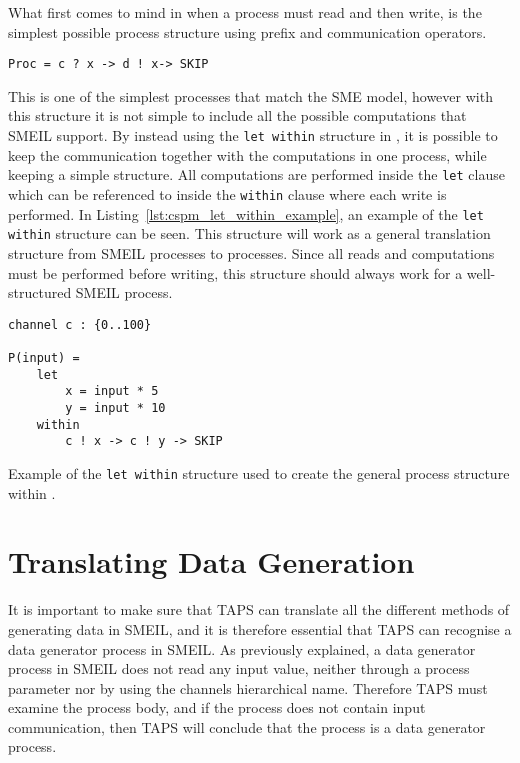 What first comes to mind in \cspm{} when a process must read and then write, is the simplest possible process structure using prefix and communication operators.
\begin{verbatim}
Proc = c ? x -> d ! x-> SKIP
\end{verbatim}
This is one of the simplest \cspm{} processes that match the SME model, however with this structure it is not simple to include all the possible computations that SMEIL support. By instead using the \texttt{let within} structure in \cspm{}, it is possible to keep the communication together with the computations in one \cspm{} process, while keeping a simple structure. All computations are performed inside the \texttt{let} clause which can be referenced to inside the \texttt{within} clause where each write is performed.
In Listing~\ref{lst:cspm_let_within_example}, an example of the \texttt{let within} structure can be seen. This structure will work as a general translation structure from SMEIL processes to \cspm{} processes. Since all reads and computations must be performed before writing, this structure should always work for a well-structured SMEIL process.
\begin{listing}
\begin{verbatim}
channel c : {0..100}

P(input) =
    let
        x = input * 5
        y = input * 10
    within
        c ! x -> c ! y -> SKIP
\end{verbatim}
\caption{Example of the \texttt{let within} structure used to create the general process structure within \cspm{}.}
\label{lst:cspm_let_within_example}
\end{listing}
\section{Translating Data Generation}
It is important to make sure that TAPS can translate all the different methods of generating data in SMEIL, and it is therefore essential that TAPS can recognise a data generator process in SMEIL. As previously explained, a data generator process in SMEIL does not read any input value, neither through a process parameter nor by using the channels hierarchical name. Therefore TAPS must examine the process body, and if the process does not contain input communication, then TAPS will conclude that the process is a data generator process. \\

